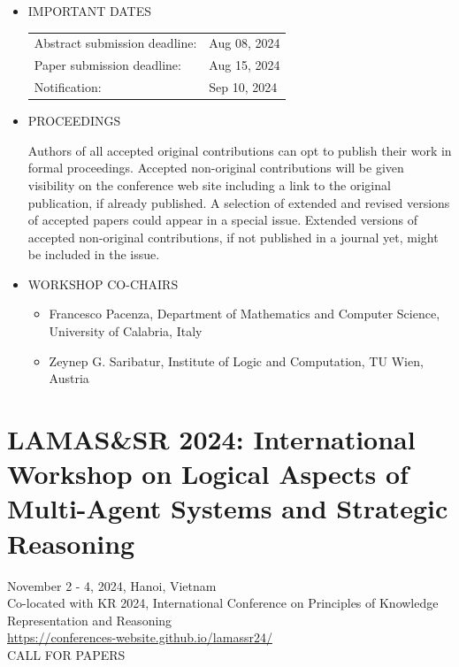 \documentclass[prodmode,acmtecs]{acmsmall} %
\begin{document}
\begin{itemize}
\item  IMPORTANT DATES 
 
\begin{tabulary}{\linewidth}{LL}Abstract submission deadline:  & Aug 08, 2024 \\
Paper submission deadline:  & Aug 15, 2024 \\
Notification:  & Sep 10, 2024 \\
\end{tabulary}
 
\item  PROCEEDINGS 
 
   Authors of all accepted original contributions can opt to publish their work in formal proceedings. Accepted non-original contributions will be given visibility on the conference web site including a link to the original publication, if already published. A selection of extended and revised versions of accepted papers could appear in a special issue. Extended versions of accepted non-original contributions, if not published in a journal yet, might be included in the issue. 
 
\item  WORKSHOP CO-CHAIRS 
 
\begin{itemize}\item  Francesco Pacenza, Department of Mathematics and Computer Science, University of Calabria, Italy
\item  Zeynep G. Saribatur, Institute of Logic and Computation, TU Wien, Austria  
\end{itemize} 
\end{itemize}\section{LAMAS\&SR 2024: International Workshop on Logical Aspects of Multi-Agent Systems and Strategic Reasoning}\label{LAMASSR2024}  November 2 - 4, 2024, Hanoi, Vietnam\\ 
  Co-located with KR 2024, International Conference on Principles of Knowledge Representation and Reasoning\\ 
  \href{https://conferences-website.github.io/lamassr24/}{https://conferences-website.github.io/lamassr24/}\\ 
CALL FOR PAPERS 
\end{document}
